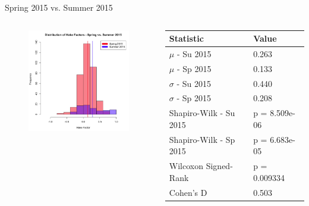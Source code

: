 \documentclass{beamer}
\begin{document}
\begin{frame}{Spring 2015 vs. Summer 2015}
\begin{columns}
\begin{column}{2in}
\begin{figure}
	\includegraphics[width=2in]{img/chapter4/hake_spring_vs_summer_filtered}
\end{figure}
\end{column}
\begin{column}{2in}
\begin{scriptsize}
\begin{table}
  \begin{tabular}{|l|l|}
    \hline
    \textbf{Statistic} & \textbf{Value} \\
	\hline
	$\mu$ - Su 2015 & 0.263 \\
	\hline
	$\mu$ - Sp 2015 & 0.133 \\
	\hline
	$\sigma$ - Su 2015 & 0.440 \\
	\hline
	$\sigma$ - Sp 2015 & 0.208 \\
	\hline
	Shapiro-Wilk - Su 2015 & p = 8.509e-06 \\
	\hline
	Shapiro-Wilk - Sp 2015 & p = 6.683e-05 \\
	\hline
	Wilcoxon Signed-Rank & p = 0.009334 \\
	\hline
	Cohen's D & 0.503 \\
	\hline
  \end{tabular}
\end{table}
\end{scriptsize}
\end{column}
\end{columns}
\end{frame}
\end{document}
